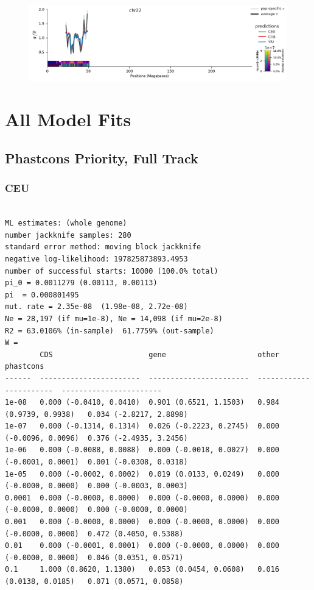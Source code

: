 \documentclass[11pt]{article}
\begin{document}
\begin{figure}[!htb]
  \centering
  \includegraphics[width=\textwidth]{figures/supplementary/pred_plot_chr22.pdf}
  \label{suppfig:fit-chr22}
\end{figure}

\clearpage

\section{All Model Fits}
\label{supp:fits}


\subsection{Phastcons Priority, Full Track}
\subsubsection*{CEU}
\begin{minipage}{\linewidth}\begin{footnotesize}
\begin{verbatim}

ML estimates: (whole genome)
number jackknife samples: 280
standard error method: moving block jackknife
negative log-likelihood: 197825873893.4953
number of successful starts: 10000 (100.0% total)
pi_0 = 0.0011279 (0.00113, 0.00113)
pi  = 0.000801495
mut. rate = 2.35e-08  (1.98e-08, 2.72e-08)
Ne = 28,197 (if mu=1e-8), Ne = 14,098 (if mu=2e-8)
R2 = 63.0106% (in-sample)  61.7759% (out-sample)
W = 
        CDS                      gene                     other                    phastcons
------  -----------------------  -----------------------  -----------------------  -----------------------
1e-08   0.000 (-0.0410, 0.0410)  0.901 (0.6521, 1.1503)   0.984 (0.9739, 0.9938)   0.034 (-2.8217, 2.8898)
1e-07   0.000 (-0.1314, 0.1314)  0.026 (-0.2223, 0.2745)  0.000 (-0.0096, 0.0096)  0.376 (-2.4935, 3.2456)
1e-06   0.000 (-0.0088, 0.0088)  0.000 (-0.0018, 0.0027)  0.000 (-0.0001, 0.0001)  0.001 (-0.0308, 0.0318)
1e-05   0.000 (-0.0002, 0.0002)  0.019 (0.0133, 0.0249)   0.000 (-0.0000, 0.0000)  0.000 (-0.0003, 0.0003)
0.0001  0.000 (-0.0000, 0.0000)  0.000 (-0.0000, 0.0000)  0.000 (-0.0000, 0.0000)  0.000 (-0.0000, 0.0000)
0.001   0.000 (-0.0000, 0.0000)  0.000 (-0.0000, 0.0000)  0.000 (-0.0000, 0.0000)  0.472 (0.4050, 0.5388)
0.01    0.000 (-0.0001, 0.0001)  0.000 (-0.0000, 0.0000)  0.000 (-0.0000, 0.0000)  0.046 (0.0351, 0.0571)
0.1     1.000 (0.8620, 1.1380)   0.053 (0.0454, 0.0608)   0.016 (0.0138, 0.0185)   0.071 (0.0571, 0.0858)
\end{verbatim}
\end{footnotesize}\end{minipage}
\end{document}
